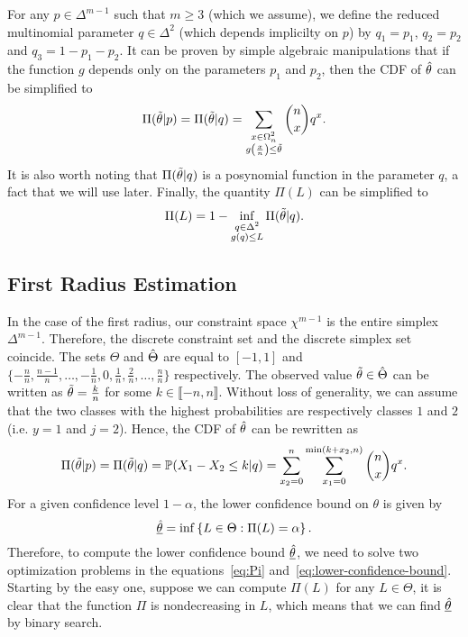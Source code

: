 For any $p\in\Delta^{m-1}$ such that $m\geq3$ (which we assume), we define the reduced multinomial parameter $q\in\Delta^2$ (which depends implicilty on $p$) by $q_1=p_1$, $q_2=p_2$ and $q_3=1-p_1-p_2$.
It can be proven by simple algebraic manipulations that if the function $g$ depends only on the parameters $p_1$ and $p_2$, then the CDF of $\Hat{\theta}$ can be simplified to
\[
    \Pi(\Tilde{\theta}|p)=\Pi(\Tilde{\theta}|q)= \sum_{\substack{x\in\Omega^{2}_n\\g\left(\frac{x}{n}\right)\leq\Tilde{\theta}}}\binom{n}{x}q^x.
\]
It is also worth noting that $\Pi(\Tilde{\theta}|q)$ is a posynomial function in the parameter $q$, a fact that we will use later.
Finally, the quantity $\Pi(L)$ can be simplified to
\[
    \Pi(L) = 1 - \inf_{\substack{q\in\Delta^{2}\\g(q)\leq L}}\Pi(\Tilde{\theta}|q).
\]

\subsection{First Radius Estimation}\label{subsec:first-radius-estimation}
In the case of the first radius, our constraint space $\chi^{m-1}$ is the entire simplex $\Delta^{m-1}$.
Therefore, the discrete constraint set and the discrete simplex set coincide.
The sets $\Theta$ and $\Hat{\Theta}$ are equal to $[ -1, 1 ]$ and $\{-\frac{n}{n},\frac{n-1}{n}, \dots,-\frac{1}{n},0,\frac{1}{n},\frac{2}{n},\dots,\frac{n}{n}\}$ respectively.
The observed value $\Tilde{\theta}\in\Hat{\Theta}$ can be written as $\Tilde{\theta} = \frac{k}{n}$ for some $k\in\llbracket -n, n \rrbracket$.
Without loss of generality, we can assume that the two classes with the highest probabilities are respectively classes $1$ and $2$ (i.e. $y=1$ and $j=2$).
Hence, the CDF of $\Hat{\theta}$ can be rewritten as
\[
    \Pi(\Tilde{\theta}|p) =\Pi(\Tilde{\theta}|q)= \mathbb{P}(X_1 - X_2\leq k|q)=\sum_{x_2=0}^n\sum_{x_1=0}^{\min(k+x_2,n)}\binom{n}{x}q^x.
\]
For a given confidence level $1-\alpha$, the lower confidence bound on $\theta$ is given by
\begin{equation}
    \underline{\Hat{\theta}} = \inf\left\{ L\in\Theta : \Pi(L) = \alpha \right\}.\label{eq:lower-confidence-bound}
\end{equation}
Therefore, to compute the lower confidence bound $\underline{\Hat{\theta}}$, we need to solve two optimization problems in the equations~\eqref{eq:Pi} and~\eqref{eq:lower-confidence-bound}.
Starting by the easy one, suppose we can compute $\Pi(L)$ for any $L\in\Theta$, it is clear that the function $\Pi$ is nondecreasing in $L$, which means that we can find $\underline{\Hat{\theta}}$ by binary search.

